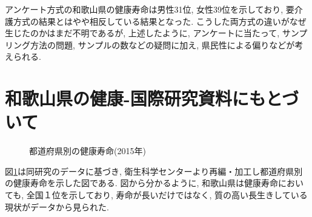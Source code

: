 アンケート方式の和歌山県の健康寿命は男性31位, 女性39位を示しており, 要介護方式の結果とはやや相反している結果となった.
こうした両方式の違いがなぜ生じたのかはまだ不明であるが, 上述したように, アンケートに当たって, サンプリング方法の問題,
サンプルの数などの疑問に加え, 県民性による偏りなどが考えられる.
\section{和歌山県の健康-国際研究資料にもとづいて}



%
%
%





\begin{figure}[h!]
	\begin{center}
		\caption{都道府県別の健康寿命(2015年)}\label{fig11}
	\end{center}
\end{figure}

図\ref{fig11}は同研究のデータに基づき, 衛生科学センターより再編・加工し都道府県別の健康寿命を示した図である. 図から分かるように, 和歌山県は健康寿命においても, 全国１位を示しており, 寿命が長いだけではなく, 質の高い長生きしている現状がデータから見られた.

